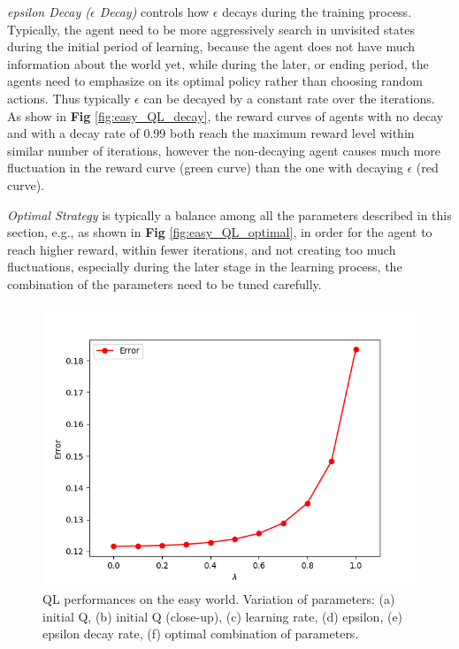 \documentclass[10pt]{article}
\begin{document}
\bigbreak
\noindent
\textit{epsilon Decay ($\epsilon$ Decay)} controls how $\epsilon$ decays during the training process. Typically, the agent need to be more aggressively search in unvisited states during the initial period of learning, because the agent does not have much information about the world yet, while during the later, or ending period, the agents need to emphasize on its optimal policy rather than choosing random actions. Thus typically $\epsilon$ can be decayed by a constant rate over the iterations. As show in \textbf{Fig} \ref{fig:easy_QL_decay}, the reward curves of agents with no decay and with a decay rate of 0.99 both reach the maximum reward level within similar number of iterations, however the non-decaying agent causes much more fluctuation in the reward curve (green curve) than the one with decaying $\epsilon$ (red curve).

\bigbreak
\noindent
\textit{Optimal Strategy} is typically a balance among all the parameters described in this section, e.g., as shown in \textbf{Fig} \ref{fig:easy_QL_optimal}, in order for  the agent to reach higher reward, within fewer iterations, and not creating too much fluctuations, especially during the later stage in the learning process, the combination of the parameters need to be tuned carefully.
\begin{figure}[h!]
  \centering
  \includegraphics[width=\linewidth]{../results/experiment1.png}
      \caption{QL performances on the easy world. Variation of parameters: (a) initial Q, (b) initial Q (close-up), (c) learning rate, (d) epsilon, (e) epsilon decay rate, (f) optimal combination of parameters.}
  \label{fig:fig3}
\end{figure}
\end{document}
